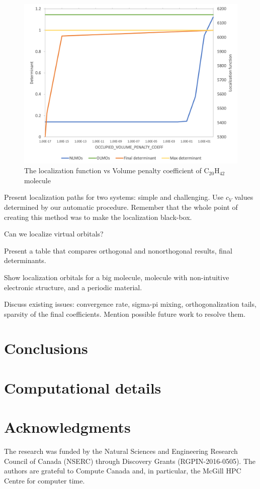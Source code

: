 \documentclass[aps,prl,reprint,amsmath,amssymb]{revtex4-1}
\begin{document}
\begin{figure}[htbp]
\includegraphics[scale=0.5]{C20H42.png} 
  \caption{The localization function vs Volume penalty coefficient of C$_{20}$H$_{42}$ molecule}
\end{figure}

Present localization paths for two systems: simple and challenging. Use $c_V$ values determined by our automatic procedure. Remember that the whole point of creating this method was to make the localization black-box.

Can we localize virtual orbitals?

Present a table that compares orthogonal and nonorthogonal results, final determinants.

Show localization orbitals for a big molecule, molecule with non-intuitive electronic structure, and a periodic material.

Discuss existing issues: convergence rate, sigma-pi mixing, orthogonalization tails, sparsity of the final coefficients. Mention possible future work to resolve them.

\section{Conclusions}


\section{Computational details}


\section{Acknowledgments} 

The research was funded by the Natural Sciences and Engineering Research Council of Canada (NSERC) through Discovery
Grants (RGPIN-2016-0505). The authors are grateful to Compute Canada and, in particular, the McGill HPC Centre for computer time.



\end{document}
